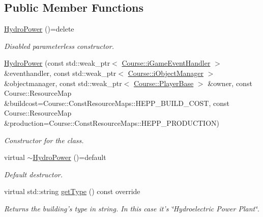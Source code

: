 \subsection*{Public Member Functions}
\begin{DoxyCompactItemize}
\item 
\hypertarget{class_student_1_1_hydro_power_a401cb3dfa71a309886a39e6fd48efddb}{\hyperlink{class_student_1_1_hydro_power_a401cb3dfa71a309886a39e6fd48efddb}{Hydro\-Power} ()=delete}\label{class_student_1_1_hydro_power_a401cb3dfa71a309886a39e6fd48efddb}

\begin{DoxyCompactList}\small\item\em Disabled parameterless constructor. \end{DoxyCompactList}\item 
\hyperlink{class_student_1_1_hydro_power_a17d16b103daba90667eded08ba06fa3e}{Hydro\-Power} (const std\-::weak\-\_\-ptr$<$ \hyperlink{class_course_1_1i_game_event_handler}{Course\-::i\-Game\-Event\-Handler} $>$ \&eventhandler, const std\-::weak\-\_\-ptr$<$ \hyperlink{class_course_1_1i_object_manager}{Course\-::i\-Object\-Manager} $>$ \&objectmanager, const std\-::weak\-\_\-ptr$<$ \hyperlink{class_course_1_1_player_base}{Course\-::\-Player\-Base} $>$ \&owner, const Course\-::\-Resource\-Map \&buildcost=Course\-::\-Const\-Resource\-Maps\-::\-H\-E\-P\-P\-\_\-\-B\-U\-I\-L\-D\-\_\-\-C\-O\-S\-T, const Course\-::\-Resource\-Map \&production=Course\-::\-Const\-Resource\-Maps\-::\-H\-E\-P\-P\-\_\-\-P\-R\-O\-D\-U\-C\-T\-I\-O\-N)
\begin{DoxyCompactList}\small\item\em Constructor for the class. \end{DoxyCompactList}\item 
\hypertarget{class_student_1_1_hydro_power_a2a05f9ced61f53dfe17cc1216d6050b9}{virtual \hyperlink{class_student_1_1_hydro_power_a2a05f9ced61f53dfe17cc1216d6050b9}{$\sim$\-Hydro\-Power} ()=default}\label{class_student_1_1_hydro_power_a2a05f9ced61f53dfe17cc1216d6050b9}

\begin{DoxyCompactList}\small\item\em Default destructor. \end{DoxyCompactList}\item 
virtual std\-::string \hyperlink{class_student_1_1_hydro_power_a3d1a591139fdd4f2c014a88fc3dcde59}{get\-Type} () const override
\begin{DoxyCompactList}\small\item\em Returns the building's type in string. In this case it's \char`\"{}\-Hydroelectric Power Plant\char`\"{}. \end{DoxyCompactList}\end{DoxyCompactItemize}
